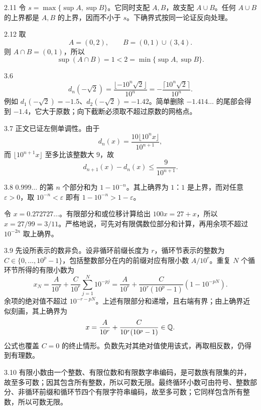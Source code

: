 \begin{solution}{2.11}
令 \(s=\max\{\sup A,\sup B\}\)。它同时支配 \(A,B\)，故支配 \(A\cup B\)。任何 \(A\cup B\) 的上界都是 \(A,B\) 的上界，因而不小于 \(s\)。下确界式按同一论证反向处理。
\end{solution}

\begin{solution}{2.12}
取
\[
 A=(0,2),\qquad B=(0,1)\cup(3,4).
\]
则 \(A\cap B=(0,1)\)，所以
\[
 \sup(A\cap B)=1<2=\min\{\sup A,\sup B\}.
\]
\end{solution}

\begin{solution}{3.6}
\[
 d_n(-\sqrt2)=\frac{\lfloor-10^n\sqrt2\rfloor}{10^n}
 =-\frac{\lceil10^n\sqrt2\rceil}{10^n}.
\]
例如 \(d_1(-\sqrt2)=-1.5\)、\(d_2(-\sqrt2)=-1.42\)。简单删除 \(-1.414\ldots\) 的尾部会得到 \(-1.4\)，它大于原数；向下截断必须取不超过原数的网格点。
\end{solution}

\begin{solution}{3.7}
正文已证左侧单调性。由于
\[
 d_n(x)=\frac{10\lfloor10^nx\rfloor}{10^{n+1}},
\]
而 \(\lfloor10^{n+1}x\rfloor\) 至多比该整数大 \(9\)，故
\[
 d_{n+1}(x)-d_n(x)\le\frac9{10^{n+1}}.
\]
\end{solution}

\begin{solution}{3.8}
\(0.999\ldots\) 的第 \(n\) 个部分和为 \(1-10^{-n}\)。其上确界为 \(1\)：\(1\) 是上界，而对任意 \(\varepsilon>0\)，取 \(10^{-n}<\varepsilon\) 即有 \(1-10^{-n}>1-\varepsilon\)。

令 \(x=0.272727\ldots\)。有限部分和或位移计算给出 \(100x=27+x\)，所以 \(x=27/99=3/11\)。严格地说，可先对有限偶数位部分和计算，再用余项不超过 \(10^{-2n}\) 取上确界。
\end{solution}

\begin{solution}{3.9}
先设所表示的数非负。设非循环前缀长度为 \(r\)，循环节表示的整数为 \(C\in\{0,\ldots,10^p-1\}\)，包括整数部分在内的前缀对应有限小数 \(A/10^r\)。重复 \(N\) 个循环节所得的有限小数为
\[
 x_N=\frac A{10^r}+\frac C{10^r}\sum_{j=1}^{N}10^{-pj}
 =\frac A{10^r}+\frac C{10^r(10^p-1)}(1-10^{-pN}).
\]
余项的绝对值不超过 \(10^{-r-pN}\)。上述有限部分和递增，且右端有界；由上确界近似刻画，其上确界为
\[
 x=\frac A{10^r}+\frac C{10^r(10^p-1)}\in\mathbb{Q}.
\]
公式也覆盖 \(C=0\) 的终止情形。负数先对其绝对值使用该式，再取相反数，仍得到有理数。
\end{solution}

\begin{solution}{3.10}
有限小数由一个整数、有限位数和有限数字串编码，是可数族有限集的并，故至多可数；因其包含所有整数，所以可数无限。最终循环小数可由符号、整数部分、非循环前缀和循环节四个有限字符串编码，故至多可数；它同样包含所有整数，所以可数无限。
\end{solution}

